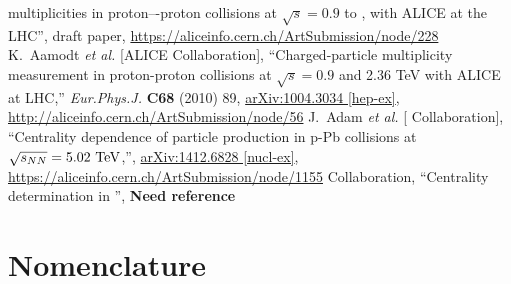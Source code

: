 \documentclass[compat,11pt]{alicenote}
\begin{document}
\begin{thebibliography}{99}
  multiplicities in proton–-proton collisions at $\sqrt{s} = 0.9$ to
  \TeV[8]{}, with ALICE at the LHC'', draft paper,
  \url{https://aliceinfo.cern.ch/ArtSubmission/node/228}
  K.~Aamodt {\it et al.}  [ALICE Collaboration],
  ``Charged-particle multiplicity measurement in proton-proton collisions at $\sqrt{s}=0.9$ and 2.36 TeV with ALICE at LHC,''
  \textit{Eur.Phys.J.} \textbf{C68} (2010) 89, 
  \href{http://arxiv.org/abs/1004.3034}{arXiv:1004.3034 [hep-ex]},
  \url{http://aliceinfo.cern.ch/ArtSubmission/node/56} 
  J.~Adam {\it et al.}  [\ALICE{} Collaboration],
  ``Centrality dependence of particle production in p-Pb collisions at
  $\usNN{pPb}{5023}$,'',
  \href{http://arxiv.org/abs/1412.6828}{arXiv:1412.6828 [nucl-ex]}, 
  \url{https://aliceinfo.cern.ch/ArtSubmission/node/1155}
  \ALICE{} Collaboration, ``Centrality determination in \PbPbCol{}'',
  \textbf{{\color{alicered} Need reference}}
\end{thebibliography}

\appendix 
\cleardoublepage
\section{Nomenclature} 
\label{app:nomen}
\end{document}
